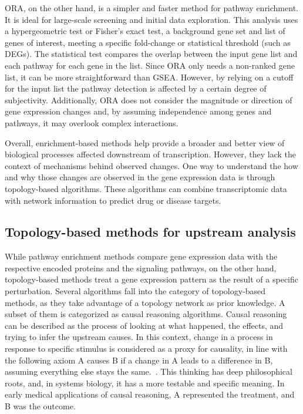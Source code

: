 \gls{ORA}, on the other hand, is a simpler and faster method for pathway enrichment. It is ideal for large-scale screening and initial data exploration. This analysis uses a hypergeometric test or Fisher's exact test, a background gene set and list of genes of interest, meeting a specific fold-change or statistical threshold (such as \gls{DEGs}). The statistical test compares the overlap between the input gene list and each pathway for each gene in the list. Since \gls{ORA} only needs a non-ranked gene list, it can be more straightforward than \gls{GSEA}. However, by relying on a cutoff for the input list the pathway detection is affected by a certain degree of subjectivity. 
Additionally, \gls{ORA} does not consider the magnitude or direction of gene expression changes and, by assuming independence among genes and pathways, it may overlook complex interactions. 

Overall, enrichment-based methods help provide a broader and better view of biological processes affected downstream of transcription. However, they lack the context of mechanisms behind observed changes.
One way to understand the how and why those changes are observed in the gene expression data is through topology-based algorithms.
These algorithms can combine transcriptomic data with network information to predict drug or disease targets.


\subsection{Topology-based methods for upstream analysis} %
\label{sub:topologybasedmethodsforupstreamanalysis}

While pathway enrichment methods compare gene expression data with the respective encoded proteins and the signaling pathways, on the other hand, topology-based methods treat a gene expression pattern as the result of a specific perturbation. Several algorithms fall into the category of topology-based methods, as they take advantage of a topology network as prior knowledge. A subset of them is categorized as causal reasoning algorithms. Causal reasoning can be described as the process of looking at what happened, the effects, and trying to infer the upstream causes. In this context, change in a process in response to specific stimulus is considered as a proxy for causality, in line with the following axiom A causes B if a change in A leads to a difference in B, assuming everything else stays the same.~\cite{RN157}. This thinking has deep philosophical roots, and, in systems biology, it has a more testable and specific meaning. In early medical applications of causal reasoning, A represented the treatment, and B was the outcome. 

